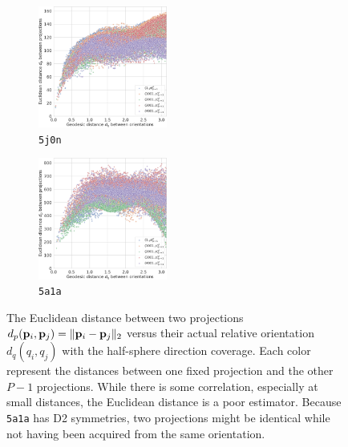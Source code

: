 \begin{figure}[ht!]
    \begin{minipage}[t]{0.57\linewidth}
        \begin{subfigure}[t]{0.48\textwidth}
            \centering
            \includegraphics[height=4cm]{figures/eucl_notrobust_5j0n}
            \caption{\texttt{5j0n}}
        \end{subfigure}
        \hfill
        \begin{subfigure}[t]{0.48\textwidth}
            \centering
            \includegraphics[height=4cm]{figures/eucl_notrobust_5a1a}
            \caption{\texttt{5a1a}}\label{fig:euclidean-not-robust:5a1a}
        \end{subfigure}
        \caption{%
            The Euclidean distance between two projections $d_p(\mathbf{p}_i, \mathbf{p}_j) = \Vert \mathbf{p}_i - \mathbf{p}_j \Vert_2$ versus their actual relative orientation $d_q(q_i, q_j)$ with the half-sphere direction coverage.
            Each color represent the distances between one fixed projection and the other $P-1$ projections.
            While there is some correlation, especially at small distances, the Euclidean distance is a poor estimator.
            Because \texttt{5a1a} has D2 symmetries, two projections might be identical while not having been acquired from the same orientation.
        }\label{fig:euclidean-not-robust}
    \end{minipage}
\end{figure}

